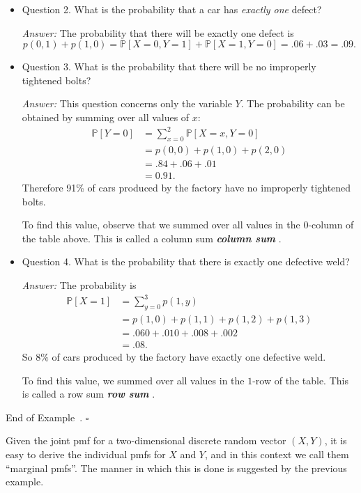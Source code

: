 \documentclass[10pt]{article}
\theoremstyle{definition}
\newtheorem{example}[theorem]{Example}
\renewenvironment{example}
{\begin{oldexample}}
  {\par\smallskip\hfill   End of Example~\theexample. $\square$    \par\end{oldexample}}
\newcommand{\1}[1]{\textbf{1}_{\left[#1\right]}} %
\def\P{\mathbb{P}} %
\DeclareRobustCommand{\demph}[1]{%
  \ifmmode
  {\color{Blue}#1}%
  \else
  {\color{Blue}\bfseries\slshape #1}%
  \fi
}
\begin{document}
\begin{example}
\begin{itemize}
    \item {Question 2.} What is the probability that a car has \textit{exactly one} defect?

    \textit{Answer:} The probability that there will be exactly one defect is
    \begin{equation*}
      p(0,1)+p(1,0) = \P\left[X=0,Y=1 \right]+ \P\left[X=1,Y=0 \right] = .06+.03 = .09.
    \end{equation*}

    \item {Question 3.} What is the probability that there will be no improperly
    tightened bolts?

    \textit{Answer: } This question concerns only the variable $Y$. The
    probability can be obtained by summing over all values of $x$:
    \begin{align*}
      \P\left[Y=0 \right] 
      &= \sum_{x=0}^{2}\P\left[X=x, Y=0 \right]\\
      &= p(0,0)+p(1,0)+p(2,0)\\
      &= .84+.06+.01\\
      &= 0.91.
    \end{align*}
    Therefore 91\% of cars produced by the factory have no improperly tightened
    bolts.
    
    To find this value, observe that we summed over all values in the $0$-column
    of the table above. This is called a \demph{column sum}.

    \item {Question 4.} What is the probability that there is exactly one defective
    weld?

    \textit{Answer:} The probability is
    \begin{align*}
      \P \left[ X=1 \right] 
      &= \sum_{y=0}^{3}p(1,y)\\ 
      &= p(1,0)+p(1,1)+p(1,2)+p(1,3)\\
      &=.060+.010+.008+.002\\
      &=.08.
    \end{align*}
    So $8\%$ of cars produced by the factory have exactly one defective weld.

    To find this value, we summed over all values in the $1$-row of the table.
    This is called a \demph{row sum}.
  \end{itemize}
\end{example}

Given the joint pmf for a two-dimensional discrete random vector $(X,Y)$, it
is easy to derive the individual pmfs for $X$ and $Y$, and in this context we
call them ``marginal pmfs''. The manner in which this is done is suggested by
the previous example.
\end{document}
